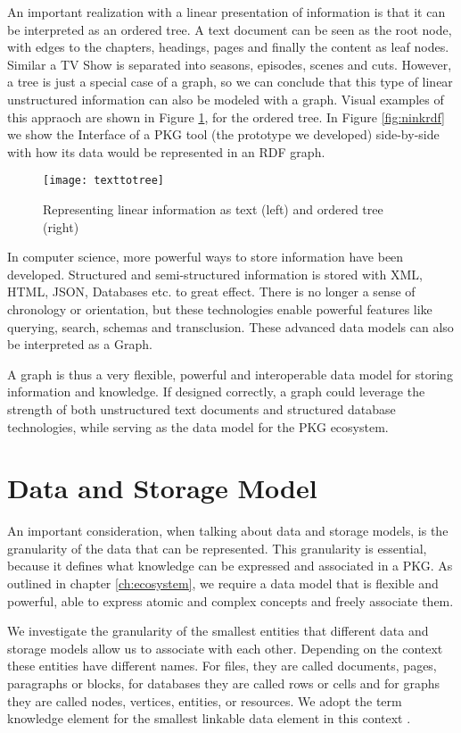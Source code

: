 An important realization with a linear presentation of information is that it can be interpreted as an ordered tree. A text document can be seen as the root node, with edges to the chapters, headings, pages and finally the content as leaf nodes. Similar a TV Show is separated into seasons, episodes, scenes and cuts. However, a tree is just a special case of a graph, so we can conclude that this type of linear unstructured information can also be modeled with a graph. Visual examples of this appraoch are shown in Figure \ref{fig:texttotree}, for the ordered tree. In Figure \ref{fig:ninkrdf} we show the Interface of a PKG tool (the prototype we developed) side-by-side with how its data would be represented in an RDF graph.

\begin{figure}[h]
\centering
\texttt{[image: texttotree]}
\caption{Representing linear information as text (left) and ordered tree (right)}
\label{fig:texttotree}
\end{figure}

In computer science, more powerful ways to store information have been developed. Structured and semi-structured information is stored with XML, HTML, JSON, Databases etc. to great effect. There is no longer a sense of chronology or orientation, but these technologies enable powerful features like querying, search, schemas and transclusion. These advanced data models can also be interpreted as a Graph.

A graph is thus a very flexible, powerful and interoperable data model for storing information and knowledge. If designed correctly, a graph could leverage the strength of both unstructured text documents and structured database technologies, while serving as the data model for the PKG ecosystem.

\section{Data and Storage Model}

An important consideration, when talking about data and storage models, is the granularity of the data that can be represented. This granularity is essential, because it defines what knowledge can be expressed and associated in a PKG. As outlined in chapter \ref{ch:ecosystem}, we require a data model that is flexible and powerful, able to express atomic and complex concepts and freely associate them.

We investigate the granularity of the smallest entities that different data and storage models allow us to associate with each other. Depending on the context these entities have different names. For files, they are called documents, pages, paragraphs or blocks, for databases they are called rows or cells and for graphs they are called nodes, vertices, entities, or resources. We adopt the term knowledge element for the smallest linkable data element in this context \cite{Davies2005Memex60}. 

